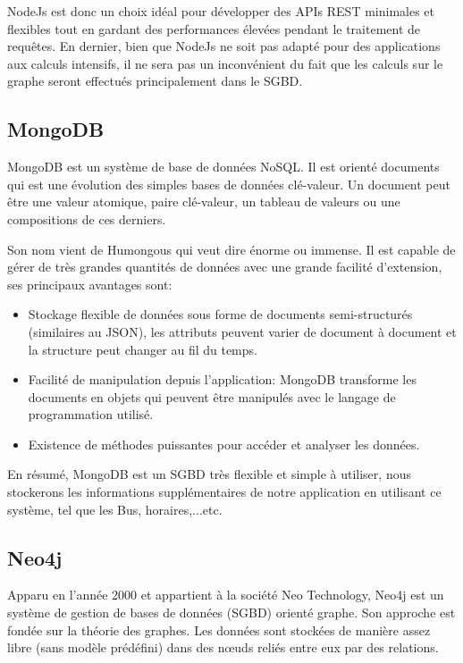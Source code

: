 NodeJs est donc un choix idéal pour développer des APIs REST minimales et flexibles tout en gardant des performances élevées pendant le traitement de requêtes.\newline
En dernier, bien que NodeJs ne soit pas adapté pour des applications aux calculs intensifs, il ne sera pas un inconvénient du fait que les calculs sur le graphe seront effectués principalement dans le \Gls{SGBD}.
\subsection{MongoDB}
	MongoDB \cite{MongoDB} est un système de base de données \Gls{NoSQL}. Il est orienté documents qui est une évolution des simples bases de données clé-valeur. Un document peut être une valeur atomique, paire clé-valeur, un tableau de valeurs ou une compositions de ces derniers.

Son nom vient de Humongous qui veut dire énorme ou immense. Il est capable de gérer de très grandes quantités de données avec une grande facilité d'extension, ses principaux avantages sont:

\begin{itemize}
	\item Stockage flexible de données sous forme de documents semi-structurés (similaires au JSON), les attributs peuvent varier de document à document et la structure peut changer au fil du temps.
	\item Facilité de manipulation depuis l'application: MongoDB transforme les documents en objets qui peuvent être manipulés avec le langage de programmation utilisé.
	\item Existence de méthodes puissantes pour accéder et analyser les données.
\end{itemize}

En résumé, MongoDB est un SGBD très flexible et simple à utiliser, nous stockerons les informations supplémentaires de notre application en utilisant ce système, tel que les Bus, horaires,...etc.

\subsection{Neo4j}
Apparu en l'année 2000 et appartient à la société Neo Technology, Neo4j \cite{Neo4j} est un système de gestion de bases de données (SGBD) orienté graphe. Son approche est fondée sur la théorie des graphes. Les données sont stockées de manière assez libre (sans modèle prédéfini) dans des nœuds reliés entre eux par des relations.

